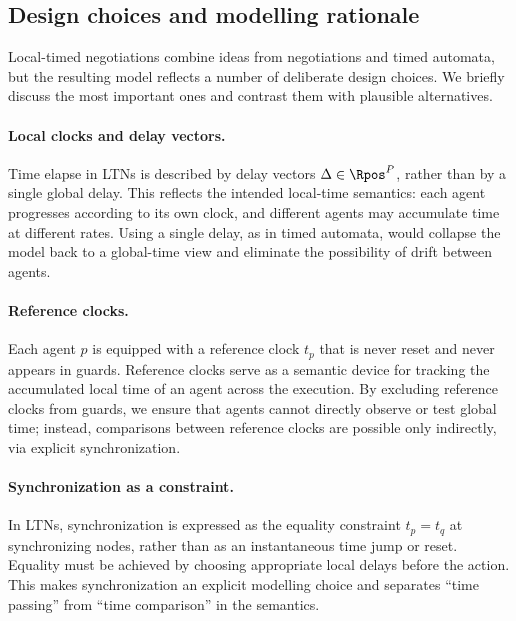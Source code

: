 
\subsection{Design choices and modelling rationale}
\label{subsec:ltn-design}

Local-timed negotiations combine ideas from negotiations and timed automata, but
the resulting model reflects a number of deliberate design choices.  We briefly
discuss the most important ones and contrast them with plausible alternatives.

\paragraph{Local clocks and delay vectors.}
Time elapse in LTNs is described by delay vectors $\Delta \in \Rpos^{P}$, rather
than by a single global delay.  This reflects the intended local-time semantics:
each agent progresses according to its own clock, and different agents may
accumulate time at different rates.  Using a single delay, as in timed automata,
would collapse the model back to a global-time view and eliminate the possibility
of drift between agents.

\paragraph{Reference clocks.}
Each agent $p$ is equipped with a reference clock $t_p$ that is never reset and
never appears in guards.  Reference clocks serve as a semantic device for tracking
the accumulated local time of an agent across the execution.  By excluding
reference clocks from guards, we ensure that agents cannot directly observe or
test global time; instead, comparisons between reference clocks are possible only
indirectly, via explicit synchronization.

\paragraph{Synchronization as a constraint.}
In LTNs, synchronization is expressed as the equality constraint
$t_p = t_q$ at synchronizing nodes, rather than as an instantaneous time jump or
reset.  Equality must be achieved by choosing appropriate local delays before the
action.  This makes synchronization an explicit modelling choice and separates
``time passing'' from ``time comparison'' in the semantics.

